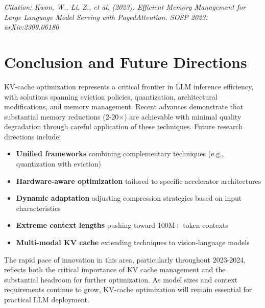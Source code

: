 \documentclass[11pt,letterpaper]{article}
\begin{document}
\textit{Citation: Kwon, W., Li, Z., et al. (2023). Efficient Memory Management for Large Language Model Serving with PagedAttention. SOSP 2023. arXiv:2309.06180}

\section{Conclusion and Future Directions}

KV-cache optimization represents a critical frontier in LLM inference efficiency, with solutions spanning eviction policies, quantization, architectural modifications, and memory management. Recent advances demonstrate that substantial memory reductions (2-20$\times$) are achievable with minimal quality degradation through careful application of these techniques. Future research directions include:

\begin{itemize}[leftmargin=*]
\item \textbf{Unified frameworks} combining complementary techniques (e.g., quantization with eviction)
\item \textbf{Hardware-aware optimization} tailored to specific accelerator architectures
\item \textbf{Dynamic adaptation} adjusting compression strategies based on input characteristics
\item \textbf{Extreme context lengths} pushing toward 100M+ token contexts
\item \textbf{Multi-modal KV cache} extending techniques to vision-language models
\end{itemize}

The rapid pace of innovation in this area, particularly throughout 2023-2024, reflects both the critical importance of KV cache management and the substantial headroom for further optimization. As model sizes and context requirements continue to grow, KV-cache optimization will remain essential for practical LLM deployment.
\end{document}
